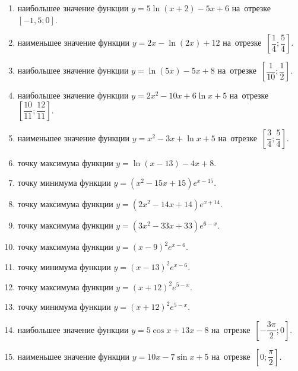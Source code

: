 \documentclass[a4paper,10pt]{article}
\begin{document}
\begin{enumerate}
\item {} наибольшее значение функции $y=5\ln \left(x+2\right)-5x+6$ на~отрезке~$\left[-1,5;0\right]$.

\item {} наименьшее значение функции $y=2x-\ln \left(2x\right)+12$ на~отрезке~$\left[\dfrac{1}{4};\dfrac{5}{4}\right]$.

\item {} наибольшее значение функции $y=\ln \left(5x\right)-5x+8$ на~отрезке~$\left[\dfrac{1}{10};\dfrac{1}{2}\right]$.

\item {} наибольшее значение функции $y=2x^2-10x+6\ln x+5$ на~отрезке~$\left[\dfrac{10}{11};\dfrac{12}{11}\right]$.

\item {} наименьшее значение функции $y=x^2-3x+\ln x+5$ на~отрезке~$\left[\dfrac{3}{4};\dfrac{5}{4}\right]$.

\item {} точку максимума функции $y=\ln \left(x-13\right)-4x+8$.

\item {} точку минимума функции $y=\left(x^2-15x+15\right)e^{x-15}$.

\item {} точку максимума функции $y=\left(2x^2-14x+14\right)e^{x+14}$.

\item {} точку максимума функции $y=\left(3x^2-33x+33\right)e^{6-x}$.

\item {} точку максимума функции $y=\left(x-9\right)^2e^{x-6}$.

\item {} точку минимума функции $y=\left(x-13\right)^2e^{x-6}$.

\item {} точку максимума функции $y=\left(x+12\right)^2e^{5-x}$.

\item {} точку минимума функции $y=\left(x+12\right)^2e^{5-x}$.

\item {} наибольшее значение функции $y=5\cos x+13x-8$ на~отрезке~$\left[-\dfrac{3\pi }{2};0\right]$.

\item {} наименьшее значение функции $y=10x-7\sin x+5$ на~отрезке~$\left[0;\dfrac{\pi }{2}\right]$.


\end{enumerate}
\end{document}
